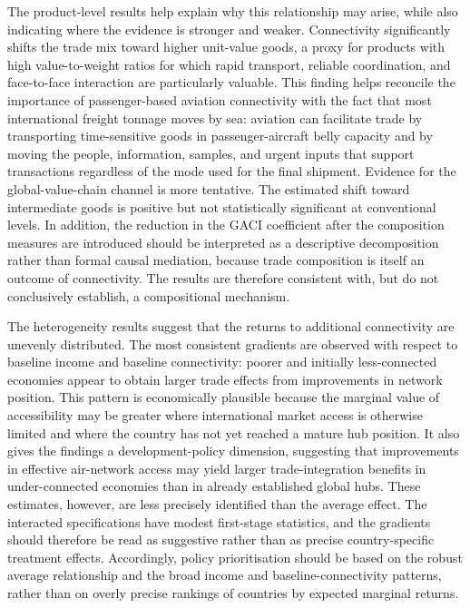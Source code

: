 The product-level results help explain why this relationship may arise, while
also indicating where the evidence is stronger and weaker. Connectivity
significantly shifts the trade mix toward higher unit-value goods, a proxy
for products with high value-to-weight ratios for which rapid transport,
reliable coordination, and face-to-face interaction are particularly
valuable. This finding helps reconcile the importance of passenger-based
aviation connectivity with the fact that most international freight tonnage
moves by sea: aviation can facilitate trade by transporting time-sensitive
goods in passenger-aircraft belly capacity and by moving the people,
information, samples, and urgent inputs that support transactions regardless
of the mode used for the final shipment. Evidence for the global-value-chain
channel is more tentative. The estimated shift toward intermediate goods is
positive but not statistically significant at conventional levels. In
addition, the reduction in the GACI coefficient after the composition
measures are introduced should be interpreted as a descriptive decomposition
rather than formal causal mediation, because trade composition is itself an
outcome of connectivity. The results are therefore consistent with, but do
not conclusively establish, a compositional mechanism.

The heterogeneity results suggest that the returns to additional connectivity
are unevenly distributed. The most consistent gradients are observed with
respect to baseline income and baseline connectivity: poorer and initially
less-connected economies appear to obtain larger trade effects from
improvements in network position. This pattern is economically plausible
because the marginal value of accessibility may be greater where
international market access is otherwise limited and where the country has
not yet reached a mature hub position. It also gives the findings a
development-policy dimension, suggesting that improvements in effective
air-network access may yield larger trade-integration benefits in
under-connected economies than in already established global hubs. These
estimates, however, are less precisely identified than the average effect.
The interacted specifications have modest first-stage statistics, and the
gradients should therefore be read as suggestive rather than as precise
country-specific treatment effects. Accordingly, policy prioritisation should
be based on the robust average relationship and the broad income and
baseline-connectivity patterns, rather than on overly precise rankings of
countries by expected marginal returns.

